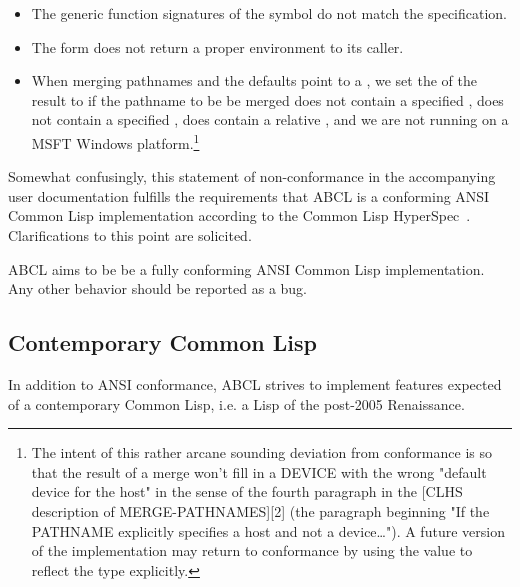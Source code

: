 \documentclass[10pt]{book}
\begin{document}
\begin{itemize}
\item The generic function signatures of the  symbol
  do not match the specification.
\item The  form does not return a proper 
  environment to its caller.
\item When merging pathnames and the defaults point to a ,
  we set the  of the result to  if the pathname to be
  be merged does not contain a specified , does not contain a
  specified , does contain a relative , and we are
  not running on a \textsc{MSFT} Windows platform.\footnote{The intent of this
    rather arcane sounding deviation from conformance is so that the
    result of a merge won't fill in a DEVICE with the wrong "default
    device for the host" in the sense of the fourth paragraph in the
    [CLHS description of MERGE-PATHNAMES][2] (the paragraph beginning
    "If the PATHNAME explicitly specifies a host and not a device…").
    A future version of the implementation may return to conformance
    by using the  value to reflect the type explicitly.
  }

\end{itemize}

Somewhat confusingly, this statement of non-conformance in the
accompanying user documentation fulfills the requirements that
\textsc{ABCL} is a conforming ANSI Common Lisp implementation according
to the Common Lisp HyperSpec~\cite{CLHS}.  Clarifications to this point
are solicited.

ABCL aims to be be a fully conforming ANSI Common Lisp implementation.
Any other behavior should be reported as a bug.

\subsection{Contemporary Common Lisp}
In addition to ANSI conformance, \textsc{ABCL} strives to implement
features expected of a contemporary Common Lisp, i.e. a Lisp of the
post-2005 Renaissance.
\end{document}
